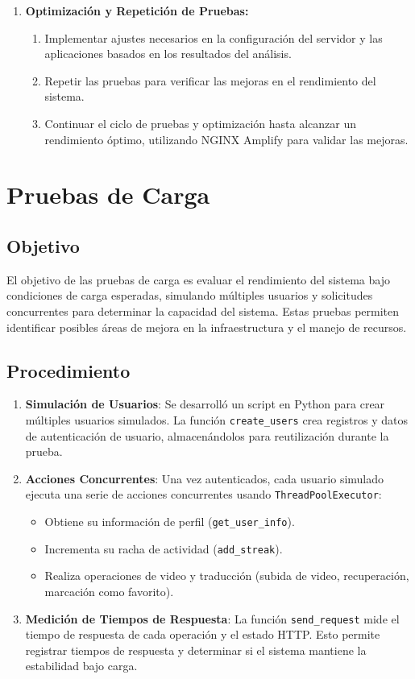 \begin{enumerate}
    \item \textbf{Optimización y Repetición de Pruebas:}
    \begin{enumerate}[label*=\alph*.]
        \item Implementar ajustes necesarios en la configuración del servidor y las aplicaciones basados en los resultados del análisis.
        \item Repetir las pruebas para verificar las mejoras en el rendimiento del sistema.
        \item Continuar el ciclo de pruebas y optimización hasta alcanzar un rendimiento óptimo, utilizando NGINX Amplify para validar las mejoras.
    \end{enumerate}
\end{enumerate}

\section{Pruebas de Carga}

\subsection{Objetivo}
El objetivo de las pruebas de carga es evaluar el rendimiento del sistema bajo condiciones de carga esperadas, simulando múltiples usuarios y solicitudes concurrentes para determinar la capacidad del sistema. Estas pruebas permiten identificar posibles áreas de mejora en la infraestructura y el manejo de recursos.

\subsection{Procedimiento}
\begin{enumerate}
    \item \textbf{Simulación de Usuarios}: Se desarrolló un script en Python para crear múltiples usuarios simulados. La función \texttt{create\_users} crea registros y datos de autenticación de usuario, almacenándolos para reutilización durante la prueba.
    \item \textbf{Acciones Concurrentes}: Una vez autenticados, cada usuario simulado ejecuta una serie de acciones concurrentes usando \texttt{ThreadPoolExecutor}:
    \begin{itemize}
        \item Obtiene su información de perfil (\texttt{get\_user\_info}).
        \item Incrementa su racha de actividad (\texttt{add\_streak}).
        \item Realiza operaciones de video y traducción (subida de video, recuperación, marcación como favorito).
    \end{itemize}
    \item \textbf{Medición de Tiempos de Respuesta}: La función \texttt{send\_request} mide el tiempo de respuesta de cada operación y el estado HTTP. Esto permite registrar tiempos de respuesta y determinar si el sistema mantiene la estabilidad bajo carga.
\end{enumerate}

